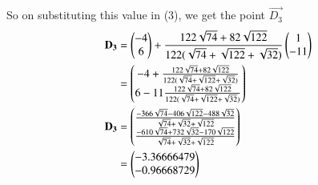 \documentclass[journal,12pt,twocolumn]{IEEEtran}
\theoremstyle{remark}
\begin{document}
So on substituting this value in (3), we get the point $\vec{D_{3}}$ 
\begin{align}
\mathbf{D_{3}} &=\begin{pmatrix}-4\\6\end{pmatrix} + \frac{122\sqrt{74}+82\sqrt{122}}{122(\sqrt{74}+\sqrt{122}+\sqrt{32})}\begin{pmatrix}1\\-11\end{pmatrix}\nonumber\\
&=\begin{pmatrix}-4+\frac{122\sqrt{74}+82\sqrt{122}}{122(\sqrt{74}+\sqrt{122}+\sqrt{32})}\\6-11\frac{122\sqrt{74}+82\sqrt{122}}{122(\sqrt{74}+\sqrt{122}+\sqrt{32})}\end{pmatrix}\nonumber\\
\mathbf{D_{3}} &=\begin{pmatrix}{\frac{-366\sqrt{74}-406\sqrt{122}-488\sqrt{32}}{\sqrt{74}+\sqrt{32}+\sqrt{122}}}\\{\frac{-610\sqrt{74}+732\sqrt{32}-170\sqrt{122}}{\sqrt{74}+\sqrt{32}+\sqrt{122}}}\end{pmatrix}\\
&=\begin{pmatrix}-3.36666479\\-0.96668729\end{pmatrix}\nonumber
\end{align}
\end{document}
